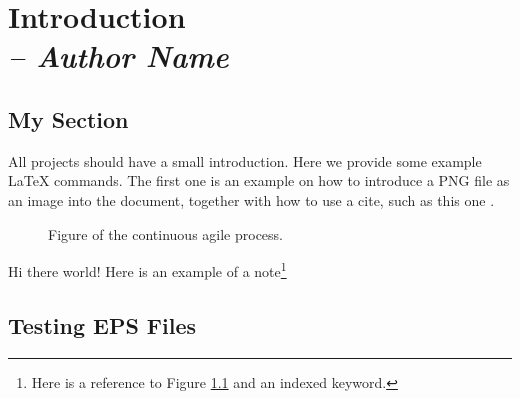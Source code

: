 \chapter{Introduction \\
\small{\textit{-- Author Name}} 
\label{Chapter::Introduction}}

\section{My Section \label{Section::MySection}}

All projects should have a small introduction.  Here we provide some
example LaTeX commands.  The first one is an example on how to
introduce a PNG file as an image into the document, together with 
how to use a cite, such as this one \cite{GM1998}.

\begin{figure}
\centering
{}
\caption{\label{Figure::manAgile} Figure of the continuous agile process.}
\end{figure}

\newpage

Hi there world!  Here is an example of a note\footnote{Here is a reference 
to Figure \ref{Figure::manAgile} and an indexed keyword.}

\section{Testing EPS Files}

